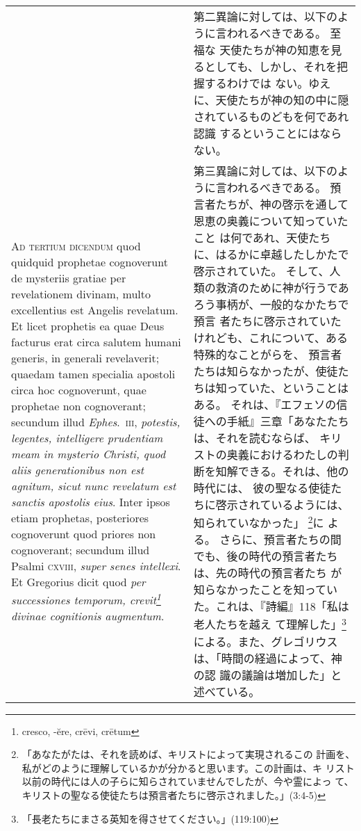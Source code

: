 \documentclass[10pt]{jsarticle} %
\begin{document}
\begin{longtable}{p{21em}p{21em}}
&

 第二異論に対しては、以下のように言われるべきである。
至福な 天使たちが神の知恵を見るとしても、しかし、それを把握するわけでは
 ない。ゆえに、天使たちが神の知の中に隠されているものどもを何であれ認識
 するということにはならない。

 \\


{\scshape Ad tertium dicendum} quod quidquid prophetae
cognoverunt de mysteriis gratiae per revelationem divinam, multo
excellentius est Angelis revelatum. Et licet prophetis ea quae Deus
facturus erat circa salutem humani generis, in generali revelaverit;
quaedam tamen specialia apostoli circa hoc cognoverunt, quae prophetae
non cognoverant; secundum illud {\itshape Ephes}.~{\scshape iii}, {\itshape potestis, legentes,
intelligere prudentiam meam in mysterio Christi, quod aliis
generationibus non est agnitum, sicut nunc revelatum est sanctis
apostolis eius}. Inter ipsos etiam prophetas, posteriores cognoverunt
quod priores non cognoverant; secundum illud Psalmi {\scshape cxviii}, {\itshape super senes
intellexi}. Et Gregorius dicit quod {\itshape per successiones temporum,
 crevit\footnote{cresco, -\u{e}re, cr\={e}vi, cr\={e}tum}
divinae cognitionis augmentum}.


&

 第三異論に対しては、以下のように言われるべきである。
預言者たちが、神の啓示を通して恩恵の奥義について知っていたこと
 は何であれ、天使たちに、はるかに卓越したしかたで啓示されていた。
 そして、人類の救済のために神が行うであろう事柄が、一般的なかたちで預言
 者たちに啓示されていたけれども、これについて、ある特殊的なことがらを、
 預言者たちは知らなかったが、使徒たちは知っていた、ということはある。
 それは、『エフェソの信徒への手紙』三章「あなたたちは、それを読むならば、
 キリストの奥義におけるわたしの判断を知解できる。それは、他の時代には、
 彼の聖なる使徒たちに啓示されているようには、知られていなかった」
 \footnote{「あなたがたは、それを読めば、キリストによって実現されるこの
 計画を、私がどのように理解しているかが分かると思います。この計画は、キ
 リスト以前の時代には人の子らに知らされていませんでしたが、今や霊によっ
 て、キリストの聖なる使徒たちは預言者たちに啓示されました。」(3:4-5)}に
 よる。
さらに、預言者たちの間でも、後の時代の預言者たちは、先の時代の預言者たち
 が知らなかったことを知っていた。これは、『詩編』118「私は老人たちを越え
 て理解した」\footnote{「長老たちにまさる英知を得させてください。」(119:100)}による。また、グレゴリウスは、「時間の経過によって、神の認
 識の議論は増加した」と述べている。

\end{longtable}
\end{document}
